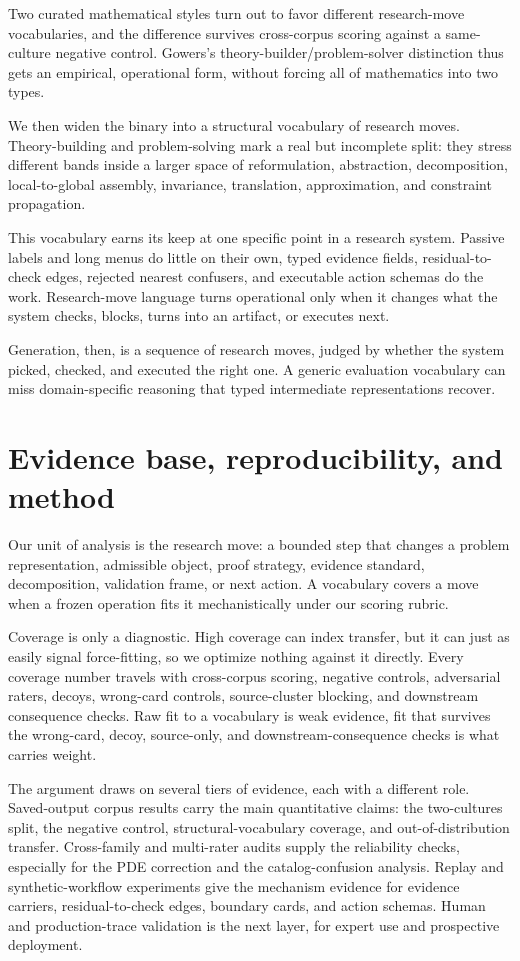 \documentclass[11pt]{article}
\begin{document}
Two curated mathematical styles turn out to favor different research-move
vocabularies, and the difference survives cross-corpus scoring against a
same-culture negative control. Gowers's theory-builder/problem-solver distinction
\citep{gowers2000} thus gets an empirical, operational form, without forcing all
of mathematics into two types.

We then widen the binary into a structural vocabulary of research moves.
Theory-building and problem-solving mark a real but incomplete split: they stress
different bands inside a larger space of reformulation, abstraction,
decomposition, local-to-global assembly, invariance, translation, approximation,
and constraint propagation.

This vocabulary earns its keep at one specific point in a research system. Passive
labels and long menus do little on their own, typed evidence fields,
residual-to-check edges, rejected nearest confusers, and executable action schemas
do the work. Research-move language turns operational only when it changes what
the system checks, blocks, turns into an artifact, or executes next.

Generation, then, is a sequence of research moves, judged by whether the system
picked, checked, and executed the right one. A generic evaluation vocabulary can
miss domain-specific reasoning that typed intermediate representations recover.

\section{Evidence base, reproducibility, and method}

Our unit of analysis is the research move: a bounded step that changes a problem
representation, admissible object, proof strategy, evidence standard,
decomposition, validation frame, or next action. A vocabulary covers a move when
a frozen operation fits it mechanistically under our scoring rubric.

Coverage is only a diagnostic. High coverage can index transfer, but it can just
as easily signal force-fitting, so we optimize nothing against it directly. Every
coverage number travels with cross-corpus scoring, negative controls, adversarial
raters, decoys, wrong-card controls, source-cluster blocking, and downstream
consequence checks. Raw fit to a vocabulary is weak evidence, fit that survives
the wrong-card, decoy, source-only, and downstream-consequence checks is what
carries weight.

The argument draws on several tiers of evidence, each with a different
role. Saved-output corpus results carry the main quantitative claims: the
two-cultures split, the negative control, structural-vocabulary coverage,
and out-of-distribution transfer. Cross-family and multi-rater audits
supply the reliability checks, especially for the PDE correction and the
catalog-confusion analysis. Replay and synthetic-workflow experiments give
the mechanism evidence for evidence carriers, residual-to-check edges,
boundary cards, and action schemas. Human and production-trace validation
is the next layer, for expert use and prospective deployment.
\end{document}
